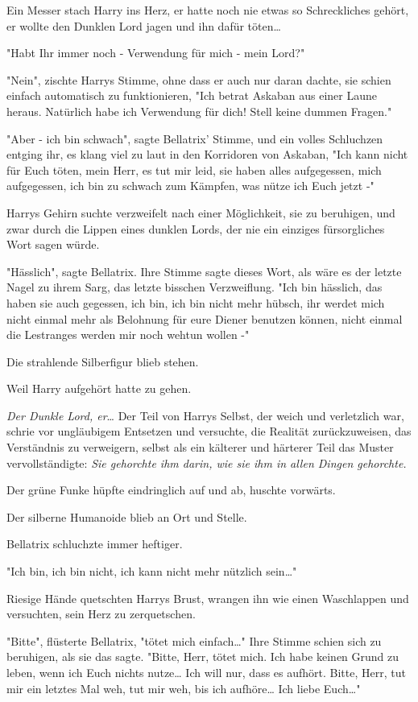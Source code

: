 {Ein Messer stach Harry ins Herz, er hatte noch nie etwas so Schreckliches gehört, er wollte den Dunklen Lord jagen und ihn dafür töten…

"Habt Ihr immer noch - Verwendung für mich - mein Lord?"

"Nein", zischte Harrys Stimme, ohne dass er auch nur daran dachte, sie schien einfach automatisch zu funktionieren, "Ich betrat Askaban aus einer Laune heraus. Natürlich habe ich Verwendung für dich! Stell keine dummen Fragen."

"Aber - ich bin schwach", sagte Bellatrix' Stimme, und ein volles Schluchzen entging ihr, es klang viel zu laut in den Korridoren von Askaban, "Ich kann nicht für Euch töten, mein Herr, es tut mir leid, sie haben alles aufgegessen, mich aufgegessen, ich bin zu schwach zum Kämpfen, was nütze ich Euch jetzt -"

Harrys Gehirn suchte verzweifelt nach einer Möglichkeit, sie zu beruhigen, und zwar durch die Lippen eines dunklen Lords, der nie ein einziges fürsorgliches Wort sagen würde.

"Hässlich", sagte Bellatrix. Ihre Stimme sagte dieses Wort, als wäre es der letzte Nagel zu ihrem Sarg, das letzte bisschen Verzweiflung. "Ich bin hässlich, das haben sie auch gegessen, ich bin, ich bin nicht mehr hübsch, ihr werdet mich nicht einmal mehr als Belohnung für eure Diener benutzen können, nicht einmal die Lestranges werden mir noch wehtun wollen -"

Die strahlende Silberfigur blieb stehen.

Weil Harry aufgehört hatte zu gehen.

\emph{Der Dunkle Lord, er}… Der Teil von Harrys Selbst, der weich und verletzlich war, schrie vor ungläubigem Entsetzen und versuchte, die Realität zurückzuweisen, das Verständnis zu verweigern, selbst als ein kälterer und härterer Teil das Muster vervollständigte: \emph{Sie gehorchte ihm darin, wie sie ihm in allen Dingen gehorchte.}

Der grüne Funke hüpfte eindringlich auf und ab, huschte vorwärts.

Der silberne Humanoide blieb an Ort und Stelle.

Bellatrix schluchzte immer heftiger.

"Ich bin, ich bin nicht, ich kann nicht mehr nützlich sein…"

Riesige Hände quetschten Harrys Brust, wrangen ihn wie einen Waschlappen und versuchten, sein Herz zu zerquetschen.

"Bitte", flüsterte Bellatrix, "tötet mich einfach…" Ihre Stimme schien sich zu beruhigen, als sie das sagte. "Bitte, Herr, tötet mich. Ich habe keinen Grund zu leben, wenn ich Euch nichts nutze… Ich will nur, dass es aufhört. Bitte, Herr, tut mir ein letztes Mal weh, tut mir weh, bis ich aufhöre… Ich liebe Euch…"

}
